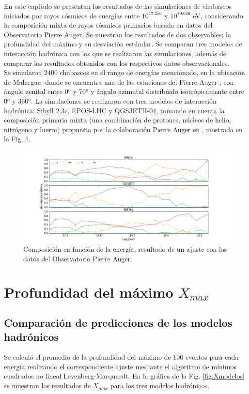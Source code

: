 En este capítulo se presentan los resultados de las simulaciones de chubascos iniciados por rayos cósmicos de energías entre $10^{17.256}$ y $10^{19.626}$ eV, considerando la composición mixta de rayos cósmicos primarios basada en datos del Observatorio Pierre Auger. Se muestran los resultados de dos observables: la profundidad del máximo y su desviación estándar. Se comparan tres modelos de interacción hadrónica con los que se realizaron las simulaciones, además de comparar los resultados obtenidos con los respectivos datos observacionales. \\

Se simularon 2400 chubascos en el rango de energías mencionado, en la ubicación de Malargue -donde se encuentra una de las estaciones del Pierre Auger-, con ángulo zenital entre 0$^{o}$ y 70$^{o}$ y ángulo azimutal distribuido isotrópicamente entre 0$^{o}$ y 360$^{o}$. La simulaciones se realizaron con tres modelos de interacción hadrónica: Sibyll 2.3c, EPOS-LHC y QGSJETII-04, tomando en cuenta la composición primaria mixta (una combinación de protones, núcleos de helio, nitrógeno y hierro) propuesta por la colaboración Pierre Auger en \cite{PAOcomposition}, mostrada en la Fig. \ref{fig:composition}.

\begin{center}
\begin{figure}[h]
\centering
\includegraphics[height=0.3\textheight]{Figuras/composition} 
\caption{Composición en función de la energía, resultado de un ajuste con los datos del Observatorio Pierre Auger.}
\label{fig:composition}
\end{figure}	
\end{center}

\section{Profundidad del máximo $X_{max}$}
\subsection{Comparación de predicciones de los modelos hadrónicos}
Se calculó el promedio de la profundidad del máximo de 100 eventos para cada energía realizando el correspondiente ajuste mediante el algoritmo de mínimos cuadrados no lineal Levenberg-Marquardt. En la gráfica de la Fig. \ref{fig:Xmodelos} se muestran los resultados de $X_{max}$ para los tres modelos hadrónicos.\\

